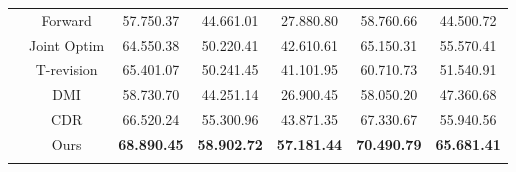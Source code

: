 \documentclass[11pt]{article}
\begin{document}
\begin{table}[!tp]
{{\begin{tabular}{c | c | c | c | c | c | c}
	                      & Forward       & 57.750.37    & 44.661.01     & 27.880.80       & 58.760.66      & 44.500.72    \\ 
	                      & Joint Optim   & 64.550.38    & 50.220.41     & 42.610.61       & 65.150.31      & 55.570.41    \\    
	                      & T-revision    & 65.401.07    & 50.241.45     & 41.101.95       & 60.710.73      & 51.540.91    \\ 
	                      & DMI           & 58.730.70    & 44.251.14     & 26.900.45       & 58.050.20      & 47.360.68    \\ 
	                      & CDR           & 66.520.24    & 55.300.96     & 43.871.35       & 67.330.67      & 55.940.56    \\ \cline{2-7}
                          & Ours          & \textbf{68.890.45}  & \textbf{58.902.72}  & \textbf{57.181.44}  & \textbf{70.490.79} & \textbf{65.681.41}    \\ 
\Xhline{2\arrayrulewidth}
\end{tabular}
}}
\label{tab:cifar_wo}
\end{table}
\end{document}
